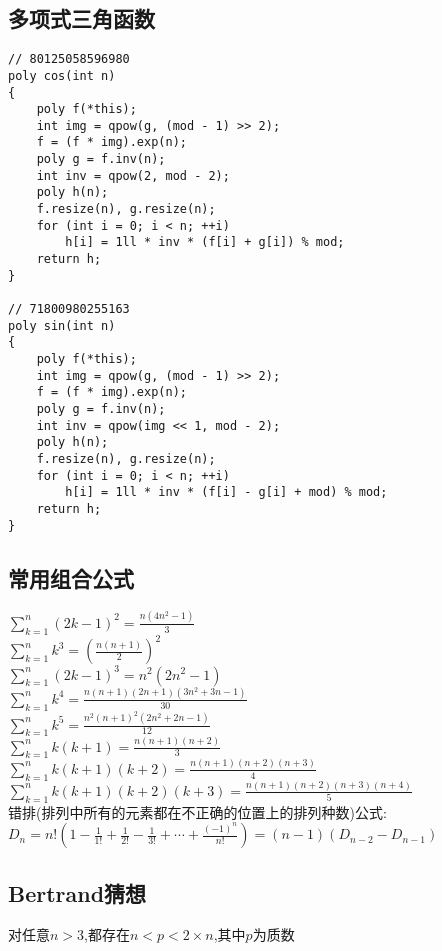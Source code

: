 \documentclass[twocolumn,a4]{article}
\begin{document}
\subsection{多项式三角函数}
\begin{lstlisting}
// 80125058596980
poly cos(int n)
{
    poly f(*this);
    int img = qpow(g, (mod - 1) >> 2);
    f = (f * img).exp(n);
    poly g = f.inv(n);
    int inv = qpow(2, mod - 2);
    poly h(n);
    f.resize(n), g.resize(n);
    for (int i = 0; i < n; ++i)
        h[i] = 1ll * inv * (f[i] + g[i]) % mod;
    return h;
}

// 71800980255163
poly sin(int n)
{
    poly f(*this);
    int img = qpow(g, (mod - 1) >> 2);
    f = (f * img).exp(n);
    poly g = f.inv(n);
    int inv = qpow(img << 1, mod - 2);
    poly h(n);
    f.resize(n), g.resize(n);
    for (int i = 0; i < n; ++i)
        h[i] = 1ll * inv * (f[i] - g[i] + mod) % mod;
    return h;
}
\end{lstlisting}
\subsection{常用组合公式}
$\displaystyle \sum_{k=1}^{n}(2k-1)^{2}=\frac{n(4n^{2}-1)}{3}$\\
$\displaystyle \sum_{k=1}^{n}k^{3}=\left(\frac{n(n+1)}{2}\right)^{2}$\\
$\displaystyle \sum_{k=1}^{n}(2k-1)^{3}=n^{2}(2n^{2}-1)$\\
$\displaystyle \sum_{k=1}^{n}k^{4}=\frac{n(n+1)(2n+1)(3n^{2}+3n-1)}{30}$\\
$\displaystyle \sum_{k=1}^{n}k^{5}=\frac{n^{2}(n+1)^{2}(2n^{2}+2n-1)}{12}$\\
$\displaystyle \sum_{k=1}^{n}k(k+1)=\frac{n(n+1)(n+2)}{3}$\\
$\displaystyle \sum_{k=1}^{n}k(k+1)(k+2)=\frac{n(n+1)(n+2)(n+3)}{4}$\\
$\displaystyle \sum_{k=1}^{n}k(k+1)(k+2)(k+3)=\frac{n(n+1)(n+2)(n+3)(n+4)}{5}$\\
错排(排列中所有的元素都在不正确的位置上的排列种数)公式:\\
$D_{n}=n!\left(1-\frac{1}{1!}+\frac{1}{2!}-\frac{1}{3!}+\cdots+\frac{(-1)^{n}}{n!}\right)=(n-1)(D_{n-2}-D_{n-1})$\\

\subsection{Bertrand猜想}
对任意$n>3$,都存在$n<p<2\times n$,其中$p$为质数\\
\end{document}
